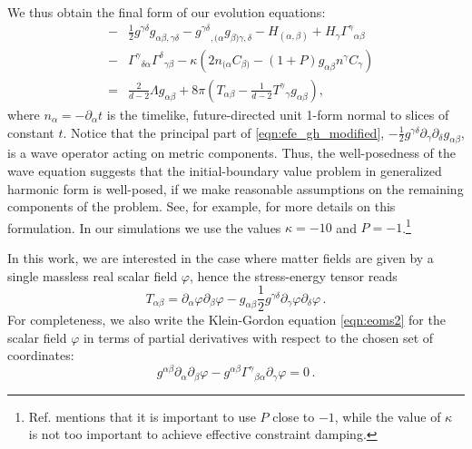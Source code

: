 \documentclass[aps,letterpaper,twocolumn,nofootinbib]{revtex4}
\numberwithin{equation}{section}
\begin{document}
We thus obtain the final form of our evolution equations:
\begin{eqnarray}
\label{eqn:efe_gh_modified}
&-& \frac{1}{2} g^{\gamma \delta} g_{\alpha\beta, \gamma \delta} - 
{g^{\gamma\delta}}_{,(\alpha} g_{\beta) \gamma, \delta} - H_{(\alpha, \beta)} + H_\gamma {\Gamma^\gamma}_{\alpha\beta} \nonumber \\
&-& {\Gamma^\gamma}_{\delta \alpha} {\Gamma^\delta}_{\gamma \beta} - \kappa \left( 2 n_{(\alpha} C_{\beta)} - (1+P) g_{\alpha\beta} n^\gamma 
C_\gamma \right) \nonumber \\
&=&  \frac{2}{d-2} \Lambda g_{\alpha\beta} + 8\pi \left( T_{\alpha\beta} - 
\frac{1}{d-2} {T^\gamma}_\gamma g_{\alpha\beta} \right),
\end{eqnarray}
where $n_\alpha=-\partial_\alpha t$ is the timelike, future-directed unit 1-form normal to slices of constant $t$.
Notice that the principal part of \eqref{eqn:efe_gh_modified}, $-\frac{1}{2} g^{\gamma \delta} \partial_\gamma \partial_\delta g_{\alpha\beta}$, is a wave operator acting on metric components. Thus, the well-posedness of the wave equation suggests that the initial-boundary value problem in generalized harmonic form is well-posed, if we make reasonable assumptions on the remaining components of the problem.
See, for example, \cite{Pretorius:2004jg,Bantilan:2012vu} for more details on this formulation. 
In our simulations we use the values $\kappa=-10$ and $P=-1$.\footnote{Ref. \cite{Bantilan:2012vu} mentions that it is important to use $P$ close to $-1$, while the value of $\kappa$ is not too important to achieve effective constraint damping.}

In this work, we are interested in the case where matter fields are given by a single massless real scalar field $\varphi$, hence the stress-energy tensor reads
\begin{equation}
\label{eq:KHmomtens}
T_{\alpha\beta}=\partial_\alpha \varphi \partial_\beta \varphi - g_{\alpha\beta} \frac{1}{2} g^{\gamma\delta} \partial_{\gamma} \varphi \partial_{\delta} \varphi\,.
\end{equation}
For completeness, we also write the Klein-Gordon equation \eqref{eqn:eoms2} for the scalar field $\varphi$ in terms of partial derivatives with respect to the chosen set of coordinates:
\begin{equation}\label{eqn:eoms2cart}
g^{\alpha\beta} \partial_{\alpha} \partial_{\beta} \varphi -g^{\alpha\beta} \Gamma^{\gamma}{}_{\beta\alpha}\partial_\gamma\varphi= 0\,.
\end{equation}
\end{document}
